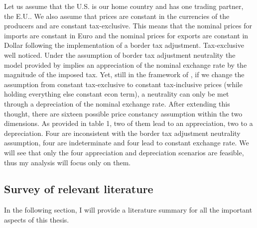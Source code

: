 Let us assume that the U.S. is our home country and has one trading partner, the E.U.. We also assume that prices are constant in the currencies of the producers and are constant tax-exclusive. This means that the nominal prices for imports are constant in Euro and the nominal prices for exports are constant in Dollar following the implementation of a border tax adjustment. Tax-exclusive well noticed. Under the assumption of border tax adjustment neutrality the model provided by \cite{buiter2017exchange} implies an appreciation of the nominal exchange rate by the magnitude of the imposed tax. Yet, still in the framework of \cite{buiter2017exchange}, if we change the assumption from constant tax-exclusive to constant tax-inclusive prices (while holding everything else constant econ term), a neutrality can only be met through a depreciation of the nominal exchange rate. 
After extending this thought, there are sixteen possible price constancy assumption within the two dimensions. As provided in table 1, two of them lead to an appreciation, two to a depreciation. Four are inconsistent with the border tax adjustment neutrality assumption, four are indeterminate and four lead to constant exchange rate. We will see that only the four appreciation and depreciation scenarios are feasible, thus my analysis will focus only on them. 


\subsection{Survey of relevant literature}
In the following section, I will provide a literature summary for all the important aspects of this thesis. \\

